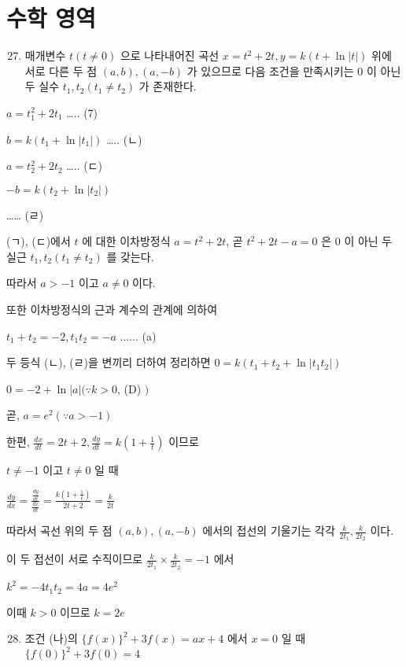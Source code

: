 \documentclass[10pt]{article}
\begin{document}
\section*{수학 영역}
\begin{enumerate}
  \setcounter{enumi}{26}
  \item 매개변수 \(t(t \neq 0)\) 으로 나타내어진 곡선 \(x=t^{2}+2 t, y=k(t+\ln |t|)\) 위에 서로 다른 두 점 \((a, b),(a,-b)\) 가 있으므로 다음 조건을 만족시키는 0 이 아닌 두 실수 \(t_{1}, t_{2}\left(t_{1} \neq t_{2}\right)\) 가 존재한다.
\end{enumerate}

\(a=t_{1}^{2}+2 t_{1}\) ….. (7)

\(b=k\left(t_{1}+\ln \left|t_{1}\right|\right)\) ….. (ㄴ)

\(a=t_{2}^{2}+2 t_{2}\) ….. (ㄷ)

\(-b=k\left(t_{2}+\ln \left|t_{2}\right|\right)\)

…… (ㄹ)

(ㄱ), (ㄷ)에서 \(t\) 에 대한 이차방정식 \(a=t^{2}+2 t\), 곧 \(t^{2}+2 t-a=0\) 은 0 이 아닌 두 실근 \(t_{1}, t_{2}\left(t_{1} \neq t_{2}\right)\) 를 갖는다.

따라서 \(a>-1\) 이고 \(a \neq 0\) 이다.

또한 이차방정식의 근과 계수의 관계에 의하여

\(t_{1}+t_{2}=-2, t_{1} t_{2}=-a\) ...... (a)

두 등식 (ㄴ), (ㄹ)을 변끼리 더하여 정리하면 \(0=k\left(t_{1}+t_{2}+\ln \left|t_{1} t_{2}\right|\right)\)

\(0=-2+\ln |a|(\because k>0\), (D) \()\)

곧, \(a=e^{2}(\because a>-1)\)

한편, \(\frac{d x}{d t}=2 t+2, \frac{d y}{d t}=k\left(1+\frac{1}{t}\right)\) 이므로

\(t \neq-1\) 이고 \(t \neq 0\) 일 때

\(\frac{d y}{d x}=\frac{\frac{d y}{d t}}{\frac{d x}{d t}}=\frac{k\left(1+\frac{1}{t}\right)}{2 t+2}=\frac{k}{2 t}\)

따라서 곡선 위의 두 점 \((a, b),(a,-b)\) 에서의 접선의 기울기는 각각 \(\frac{k}{2 t_{1}}, \frac{k}{2 t_{2}}\) 이다.

이 두 접선이 서로 수직이므로 \(\frac{k}{2 t_{1}} \times \frac{k}{2 t_{2}}=-1\) 에서

\(k^{2}=-4 t_{1} t_{2}=4 a=4 e^{2}\)

이때 \(k>0\) 이므로 \(k=2 e\)

\begin{enumerate}
  \setcounter{enumi}{27}
  \item 조건 (나)의 \(\{f(x)\}^{2}+3 f(x)=a x+4\) 에서 \(x=0\) 일 때 \(\{f(0)\}^{2}+3 f(0)=4\)
\end{enumerate}
\end{document}
